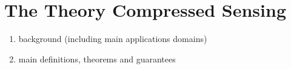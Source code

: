 \section{The Theory Compressed Sensing}

\begin{enumerate}
	\item background (including main applications domains)
	\item main definitions, theorems and guarantees
\end{enumerate}